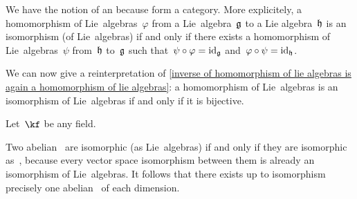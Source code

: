 \begin{remark}
  We have the notion of an  because \liealgebras{$\kf$} form a category.
  More explicitely, a homomorphism of Lie~algebras~$\varphi$ from a Lie~algebra~$\mathfrak{g}$ to a Lie algebra~$\mathfrak{h}$ is an isomorphism (of Lie~algebras) if and only if there exists a homomorphism of Lie~algebras~$\psi$ from~$\mathfrak{h}$ to~$\mathfrak{g}$ such that~$\psi \circ \varphi = \mathrm{id}_{\mathfrak{g}}$ and~$\varphi \circ \psi = \mathrm{id}_{\mathfrak{h}}$.

  We can now give a reinterpretation of \cref{inverse of homomorphism of lie algebras is again a homomorphism of lie algebras}:
  a homomorphism of Lie~algebras is an isomorphism of Lie~algebras if and only if it is bijective.
\end{remark}


\begin{example}
  Let~$\kf$ be any field.

  Two abelian~{\liealgebras{$\kf$}} are isomorphic (as Lie~algebras) if and only if they are isomorphic as~{\vectorspaces{$\kf$}}, because every vector space isomorphism between them is already an isomorphism of Lie~algebras.
  It follows that there exists up to isomorphism precisely one abelian~{\liealgebra{$\kf$}} of each dimension.
\end{example}


